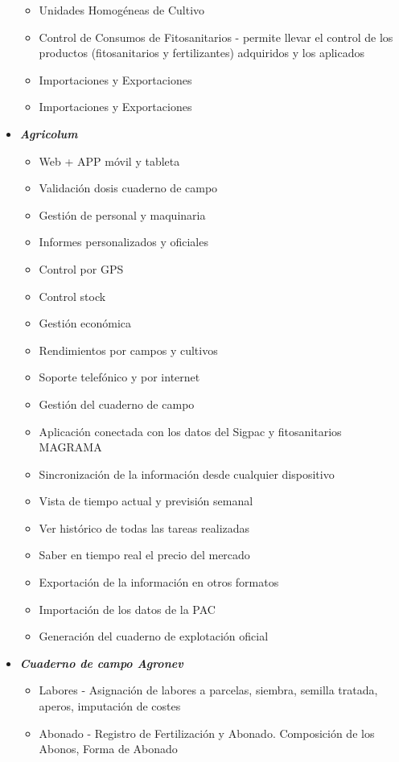 \begin{itemize}
\begin{itemize}
\item Unidades Homogéneas de Cultivo
\item Control de Consumos de Fitosanitarios - permite llevar el control de los productos (fitosanitarios y fertilizantes) adquiridos y los aplicados
\item Importaciones y Exportaciones 
\item Importaciones y Exportaciones 
\end{itemize}
\item \textbf{\textit{Agricolum}} \cite{agricolum}
\begin{itemize}
\item Web + APP móvil y tableta
\item Validación dosis cuaderno de campo
\item Gestión de personal y maquinaria
\item Informes personalizados y oficiales
\item Control por GPS
\item Control stock
\item Gestión económica
\item Rendimientos por campos y cultivos
\item Soporte telefónico y por internet
\item Gestión del cuaderno de campo
\item Aplicación conectada con los datos del Sigpac y fitosanitarios MAGRAMA
\item Sincronización de la información desde cualquier dispositivo
\item Vista de tiempo actual y previsión semanal
\item Ver histórico de todas las tareas realizadas
\item Saber en tiempo real el precio del mercado
\item Exportación de la información en otros formatos
\item Importación de los datos de la PAC
\item Generación del cuaderno de explotación oficial
\end{itemize}
\item \textbf{\textit{Cuaderno de campo Agronev}} \cite{agronev}
\begin{itemize}
\item Labores - Asignación de labores a parcelas, siembra, semilla tratada, aperos, imputación de costes
\item Abonado - Registro de Fertilización y Abonado. Composición de los Abonos, Forma de Abonado

\end{itemize}
\end{itemize}

